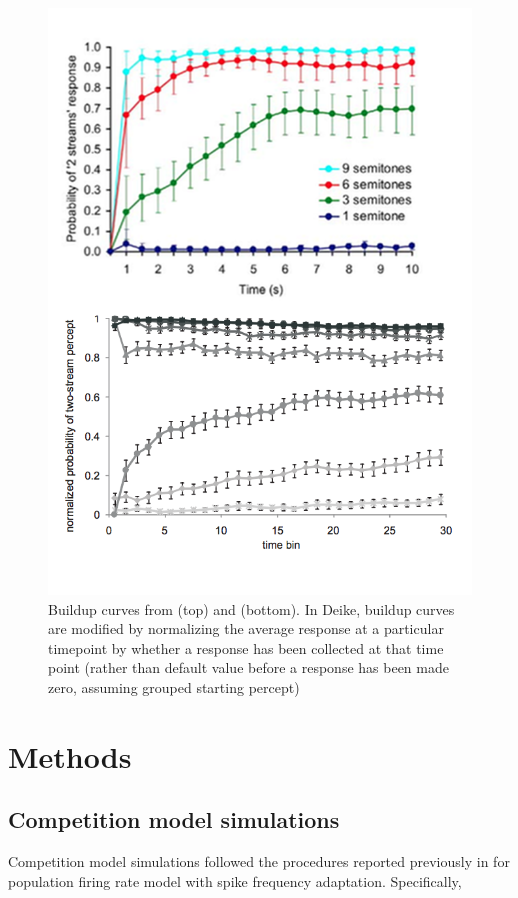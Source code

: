 \documentclass[10pt]{article}
\begin{document}
\begin{figure}
	\centering
	\includegraphics[scale=0.5]{../lit_buildup}
	\caption{Buildup curves from \cite{Micheyl2005} (top) and \cite{Deike2012} (bottom). In Deike, buildup curves are modified by normalizing the average response at a particular timepoint by whether a response has been collected at that time point (rather than default value before a response has been made zero, assuming grouped starting percept)}
	\label{fig:lit_buildup}
\end{figure}

\section*{Methods}
\subsection*{Competition model simulations}
Competition model simulations followed the procedures reported previously in \cite{Shpiro2009} for population firing rate model with spike frequency adaptation. Specifically,
\end{document}
